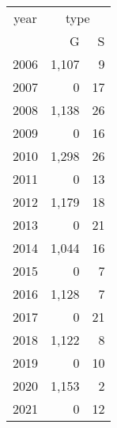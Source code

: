 \footnotesize\begin{tabular}[t]{lrr}
\toprule
\multicolumn{1}{c}{year} & \multicolumn{2}{c}{type} \\
\cmidrule(l{3pt}r{3pt}){1-1} \cmidrule(l{3pt}r{3pt}){2-3}
  & G & S\\
\midrule
2006 & 1,107 & 9\\
2007 & 0 & 17\\
2008 & 1,138 & 26\\
2009 & 0 & 16\\
2010 & 1,298 & 26\\
2011 & 0 & 13\\
2012 & 1,179 & 18\\
2013 & 0 & 21\\
2014 & 1,044 & 16\\
2015 & 0 & 7\\
2016 & 1,128 & 7\\
2017 & 0 & 21\\
2018 & 1,122 & 8\\
2019 & 0 & 10\\
2020 & 1,153 & 2\\
2021 & 0 & 12\\
\bottomrule
\end{tabular}
